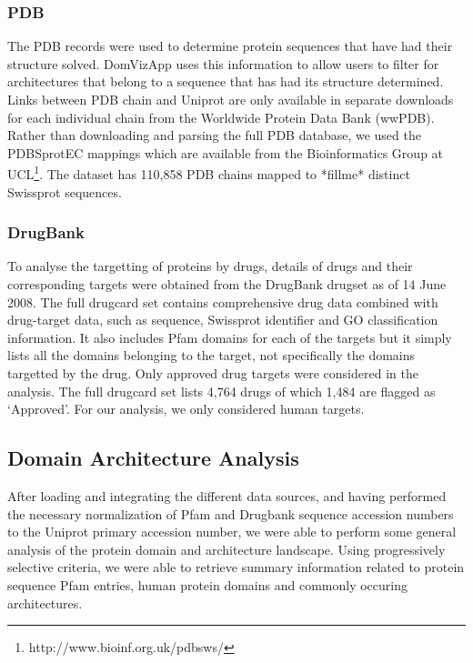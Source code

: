 \subsubsection{PDB}
The PDB records were used to determine protein sequences that have had their structure solved. DomVizApp uses this information to allow users to filter for architectures that belong to a sequence that has had its structure determined. Links between PDB chain and Uniprot are only available in separate downloads for each individual chain from the Worldwide Protein Data Bank (wwPDB). Rather than downloading and parsing the full PDB database, we used the PDBSprotEC mappings \cite{pdbsprotec} which are available from the Bioinformatics Group at UCL\footnote{http://www.bioinf.org.uk/pdbsws/}. The dataset has 110,858 PDB chains mapped to *fillme* distinct Swissprot sequences. 

\subsubsection{DrugBank}
To analyse the targetting of proteins by drugs, details of drugs and their corresponding targets were obtained from the DrugBank \cite{drugbank} drugset as of 14 June 2008. The full drugcard set contains comprehensive drug data combined with drug-target data, such as sequence, Swissprot identifier and GO classification information. It also includes Pfam domains for each of the targets but it simply lists all the domains belonging to the target, not specifically the domains targetted by the drug. Only approved drug targets were considered in the analysis. The full drugcard set lists 4,764 drugs of which 1,484 are flagged as `Approved'. For our analysis, we only considered human targets. 


\subsection{Domain Architecture Analysis}
After loading and integrating the different data sources, and having performed the necessary normalization of Pfam and Drugbank sequence accession numbers to the Uniprot primary accession number, we were able to perform some general analysis of the protein domain and architecture landscape. Using progressively selective criteria, we were able to retrieve summary information related to protein sequence Pfam entries, human protein domains and commonly occuring architectures.

